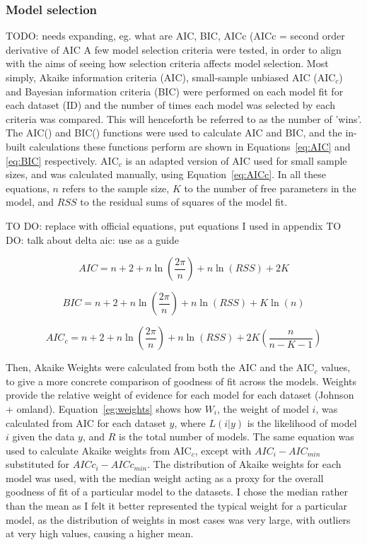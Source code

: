 \documentclass[11pt, a4paper]{article}
\begin{document}
	\subsubsection*{Model selection}
	TODO: needs expanding, eg. what are AIC, BIC, AICc (AICc = second order derivative of AIC \cite{johnsonModelSelectionEcology2004}
	A few model selection criteria were tested, in order to align with the aims of seeing how selection criteria affects model selection. Most simply, Akaike information criteria (AIC), small-sample unbiased AIC (AIC$_c$) and Bayesian information criteria (BIC) were performed on each model fit for each dataset (ID) and the number of times each model was selected by each criteria was compared. This will henceforth be referred to as the number of 'wins'. The AIC() and BIC() functions were used to calculate AIC and BIC, and the in-built calculations these functions perform are shown in Equations~\ref{eq:AIC} and \ref{eq:BIC} respectively. AIC$_c$ is an adapted version of AIC used for small sample sizes, and was calculated manually, using Equation~\ref{eq:AICc}. In all these equations, $n$ refers to the sample size, $K$ to the number of free parameters in the model, and $RSS$ to the residual sums of squares of the model fit. 

TO DO: replace with official equations, put equations I used in appendix
TO DO: talk about delta aic: use \cite{krenekThermalPerformanceCurves2011} as a guide

	\begin{equation} \label{eq:AIC}
	AIC = n + 2 + n\ln
		\left(
			\frac{2\pi}{n}								\right) 
	+ n\ln(RSS) + 2K
	\end{equation}
	
	\begin{equation} \label{eq:BIC}
	BIC = n + 2 + n\ln
		\left(
			\frac{2\pi}{n}								\right) 
	+ n\ln(RSS) + K\ln(n)
	\end{equation}
	
	\begin{equation} \label{eq:AICc}
	AIC_c = n + 2 + n\ln
		\left(
			\frac{2\pi}{n}								\right) 
	+ n\ln(RSS) + 2K 
		\left(
			\frac{n}{n - K - 1}
		\right)
	\end{equation}
	
	Then, Akaike Weights were calculated from both the AIC and the AIC$_c$ values, to give a more concrete comparison of goodness of fit across the models. Weights provide the relative weight of evidence for each model for each dataset (Johnson + omland). Equation~\ref{eg:weights} shows how $W_i$, the weight of model $i$, was calculated from AIC for each dataset $y$, where $L(i | y)$ is the likelihood of model $i$ given the data $y$, and $R$ is the total number of models. The same equation was used to calculate Akaike weights from AIC$_c$, except with $AIC_i - AIC_{min}$ substituted for $AICc_i - AICc_{min}$. The distribution of Akaike weights for each model was used, with the median weight acting as a proxy for the overall goodness of fit of a particular model to the datasets. I chose the median rather than the mean as I felt it better represented the typical weight for a particular model, as the distribution of weights in most cases was very large, with outliers at very high values, causing a higher mean.
	
\end{document}
